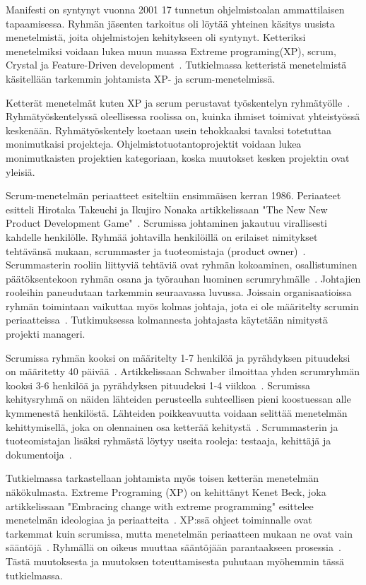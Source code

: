\documentclass[finnish]{tktltiki2}
\theoremstyle{definition}
\theoremstyle{remark}
\begin{document}
Manifesti on syntynyt vuonna 2001 17 tunnetun ohjelmistoalan ammattilaisen tapaamisessa. Ryhmän jäsenten tarkoitus oli löytää yhteinen käsitys uusista menetelmistä, joita ohjelmistojen kehitykseen oli syntynyt. Ketteriksi menetelmiksi voidaan lukea muun muassa Extreme programing(XP), scrum, Crystal ja Feature-Driven development~\cite{fowler2001agile}. Tutkielmassa ketteristä menetelmistä käsitellään tarkemmin johtamista XP- ja scrum-menetelmissä.

Ketterät menetelmät kuten XP ja scrum perustavat työskentelyn ryh\-mä\-työl\-le~\cite{4755768}. Ryhmätyöskentelyssä oleellisessa roolissa on, kuinka ihmiset toimivat yhteistyössä keskenään. Ryhmätyöskentely koetaan usein tehokkaaksi tavaksi totetuttaa monimutkaisi projekteja. Ohjelmistotuotantoprojektit voidaan lukea monimutkaisten projektien kategoriaan, koska muutokset kesken projektin ovat yleisiä. 

Scrum-menetelmän periaatteet esiteltiin ensimmäisen kerran 1986. Periaateet esitteli Hirotaka Takeuchi ja Ikujiro Nonaka artikkelissaan "The New New Product Development Game"~\cite{nonaka1986new}. Scrumissa johtaminen jakautuu virallisesti kahdelle henkilölle. Ryhmää johtavilla henkilöillä on erilaiset nimitykset tehtävänsä mukaan, scrummaster ja tuoteomistaja (product owner)~\cite{4755768}. Scrummasterin rooliin liittyviä tehtäviä ovat ryhmän kokoaminen, osallistuminen päätöksentekoon ryhmän osana ja työrauhan luominen scrumryhmälle~\cite{4755768}. Johtajien rooleihin paneudutaan tarkemmin seuraavassa luvussa. Joissain organisaatioissa ryhmän toimintaan vaikuttaa myös kolmas johtaja, jota ei ole määritelty scrumin periaatteissa~\cite{4755768}. Tutkimuksessa kolmannesta johtajasta käytetään nimitystä projekti manageri. 

Scrumissa ryhmän kooksi on määritelty 1-7 henkilöä ja pyrähdyksen pituudeksi on määritetty 40 päivää~\cite{cohen2004introduction}. Artikkelissaan Schwaber ilmoittaa yhden scrumryhmän kooksi 3-6 henkilöä ja pyrähdyksen pituudeksi 1-4 viikkoa~\cite{schwaber1995scrum}. Scrumissa kehitysryhmä on näiden lähteiden perusteella suhteellisen pieni koostuessan alle kymmenestä henkilöstä. Lähteiden poikkeavuutta voidaan selittää menetelmän kehittymisellä, joka on olennainen osa ketterää kehitystä~\cite{fowler2001agile}. Scrummasterin ja tuoteomistajan lisäksi ryhmästä löytyy useita rooleja: testaaja, kehittäjä ja dokumentoija~\cite{schwaber1995scrum}.

Tutkielmassa tarkastellaan johtamista myös toisen ketterän menetelmän näkökulmasta. Extreme Programing (XP) on kehittänyt Kenet Beck, joka artikkelissaan "Embracing change with extreme programming" esittelee menetelmän ideologiaa ja periaatteita~\cite{796139}. XP:ssä ohjeet toiminnalle ovat tarkemmat kuin scrumissa, mutta menetelmän periaatteen mukaan ne ovat vain sääntöjä~\cite{cohen2004introduction}. Ryhmällä on oikeus muuttaa sääntöjään parantaakseen prosessia~\cite{cohen2004introduction}. Tästä muutoksesta ja muutoksen toteuttamisesta puhutaan myöhemmin tässä tutkielmassa. 
\end{document}

